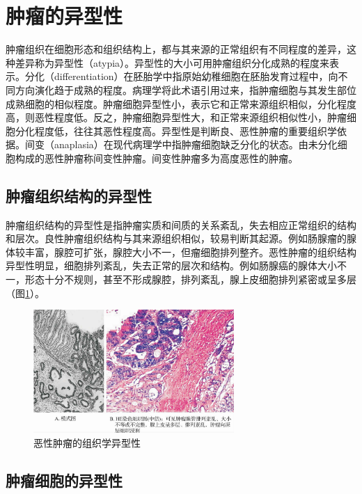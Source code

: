 \section{肿瘤的异型性}

肿瘤组织在细胞形态和组织结构上，都与其来源的正常组织有不同程度的差异，这种差异称为异型性（atypia）。异型性的大小可用肿瘤组织分化成熟的程度来表示。分化（differentiation）在胚胎学中指原始幼稚细胞在胚胎发育过程中，向不同方向演化趋于成熟的程度。病理学将此术语引用过来，指肿瘤细胞与其发生部位成熟细胞的相似程度。肿瘤细胞异型性小，表示它和正常来源组织相似，分化程度高，则恶性程度低。反之，肿瘤细胞异型性大，和正常来源组织相似性小，肿瘤细胞分化程度低，往往其恶性程度高。异型性是判断良、恶性肿瘤的重要组织学依据。间变（anaplasia）在现代病理学中指肿瘤细胞缺乏分化的状态。由未分化细胞构成的恶性肿瘤称间变性肿瘤。间变性肿瘤多为高度恶性的肿瘤。

\subsection{肿瘤组织结构的异型性}

肿瘤组织结构的异型性是指肿瘤实质和间质的关系紊乱，失去相应正常组织的结构和层次。良性肿瘤组织结构与其来源组织相似，较易判断其起源。例如肠腺瘤的腺体较丰富，腺腔可扩张，腺腔大小不一，但瘤细胞排列整齐。恶性肿瘤的组织结构异型性明显，细胞排列紊乱，失去正常的层次和结构。例如肠腺癌的腺体大小不一，形态十分不规则，甚至不形成腺腔，排列紊乱，腺上皮细胞排列紧密或呈多层（图\ref{fig5-2}）。

\begin{figure}[!htbp]
  \centering
  \includegraphics[width=0.68\textwidth]{./images/Image00069.jpg}
  \caption{恶性肿瘤的组织学异型性}
  \label{fig5-2}
\end{figure}

\subsection{肿瘤细胞的异型性}

